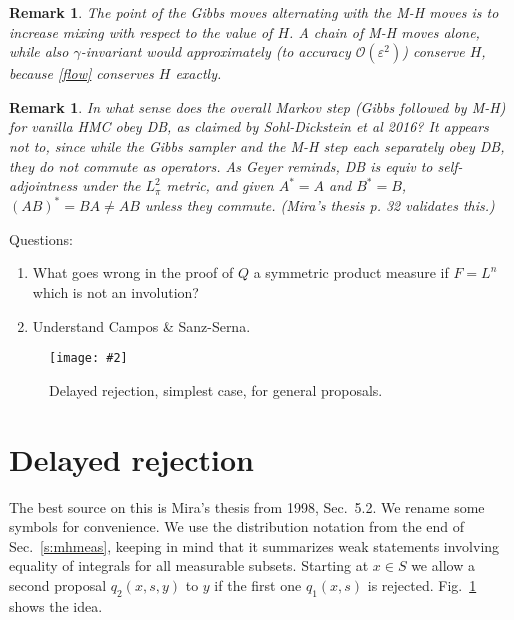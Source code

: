 \documentclass[10pt]{article}
\newcommand{\ben}{\begin{enumerate}}
\newcommand{\een}{\end{enumerate}}
\newcommand{\bfi}{\begin{figure}}
\newcommand{\efi}{\end{figure}}
\newcommand{\ca}[2]{\caption{#1 \label{#2}}}
\newcommand{\ig}[2]{\texttt{[image: \#2]}}
\newcommand{\bigO}{{\mathcal O}}
\newtheorem{rmk}[thm]{Remark}
\newcommand{\eps}{\varepsilon}
\begin{document}
\begin{rmk}
  The point of the Gibbs moves alternating with the M-H moves
  is to increase mixing with respect to
  the value of $H$. A chain of M-H moves alone, while
  also $\gamma$-invariant would approximately
  (to accuracy $\bigO(\eps^2)$) conserve $H$, because \eqref{flow} conserves
  $H$ exactly.
\end{rmk}

\begin{rmk}
  In what sense does the overall Markov step (Gibbs followed by M-H) for vanilla HMC obey DB, as claimed by Sohl-Dickstein et al 2016?
  It appears not to, since while the Gibbs sampler and the M-H step
  each separately obey DB, they do not commute as operators.
  As Geyer reminds, DB is equiv to self-adjointness under the $L^2_\pi$ metric,
  and given $A^\ast=A$ and $B^\ast=B$,
  $(AB)^\ast = BA \neq AB$ unless they commute. (Mira's thesis p. 32 validates
  this.)
\end{rmk}

Questions:
\ben
\item What goes wrong in the proof of $Q$ a symmetric product measure
  if $F=L^n$ which is not an involution?
\item Understand Campos \& Sanz-Serna.
\een
  


\bfi  %
\centering\ig{width=5in}{Mira.eps}
\ca{Delayed rejection, simplest case, for general proposals.}{f:mira}
\efi


\section{Delayed rejection}

The best source on this is Mira's thesis from 1998, Sec.~5.2.
We rename some symbols for convenience.
We use the distribution notation from the end of
Sec.~\ref{s:mhmeas}, keeping in mind that it summarizes
weak statements involving equality of integrals for all measurable subsets.
Starting at $x\in S$ we allow a second proposal $q_2(x,s,y)$ to $y$ if
the first one $q_1(x,s)$ is rejected.
Fig.~\ref{f:mira} shows the idea.











\end{document}
